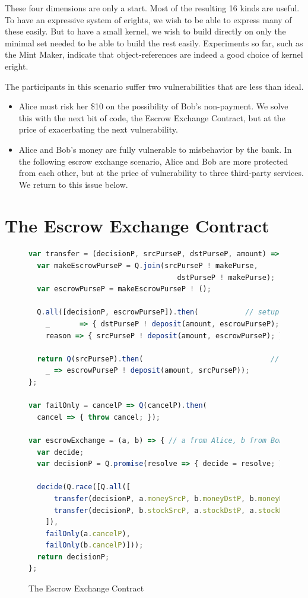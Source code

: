 \documentclass{llncs}
\begin{document}
These four dimensions are only a start. Most of the resulting 16 kinds are useful. To have an expressive system of erights, we wish to be able to express many of these easily. But to have a small kernel, we wish to build directly on only the minimal set needed to be able to build the rest easily. Experiments so far, such as the Mint Maker, indicate that object-references are indeed a good choice of kernel eright.

The participants in this scenario suffer two vulnerabilities that are less than ideal.
\begin{itemize}
\item Alice must risk her \$10 on the possibility of Bob's non-payment. We solve this with the next bit of code, the Escrow Exchange Contract, but at the price of exacerbating the next vulnerability.
\item Alice and Bob's money are fully vulnerable to misbehavior by the bank. In the following escrow exchange scenario, Alice and Bob are more protected from each other, but at the price of vulnerability to three third-party services. We return to this issue below.
\end{itemize}



\section{The Escrow Exchange Contract}

\begin{figure}[htbp]
\begin{lstlisting}[language=javascript]
var transfer = (decisionP, srcPurseP, dstPurseP, amount) => {
  var makeEscrowPurseP = Q.join(srcPurseP ! makePurse, 
                                   dstPurseP ! makePurse);
  var escrowPurseP = makeEscrowPurseP ! ();

  Q.all([decisionP, escrowPurseP]).then(           // setup phase 2
    _       => { dstPurseP ! deposit(amount, escrowPurseP); },
    reason => { srcPurseP ! deposit(amount, escrowPurseP); });
    
  return Q(srcPurseP).then(                              // phase 1
    _ => escrowPurseP ! deposit(amount, srcPurseP));
};

var failOnly = cancelP => Q(cancelP).then(
  cancel => { throw cancel; });

var escrowExchange = (a, b) => { // a from Alice, b from Bob
  var decide;
  var decisionP = Q.promise(resolve => { decide = resolve; });

  decide(Q.race([Q.all([
      transfer(decisionP, a.moneySrcP, b.moneyDstP, b.moneyNeeded),
      transfer(decisionP, b.stockSrcP, a.stockDstP, a.stockNeeded)
    ]), 
    failOnly(a.cancelP), 
    failOnly(b.cancelP)]));
  return decisionP;
};
\end{lstlisting}
\caption{The Escrow Exchange Contract}
\label{escrowExchange}
\end{figure}
\end{document}
